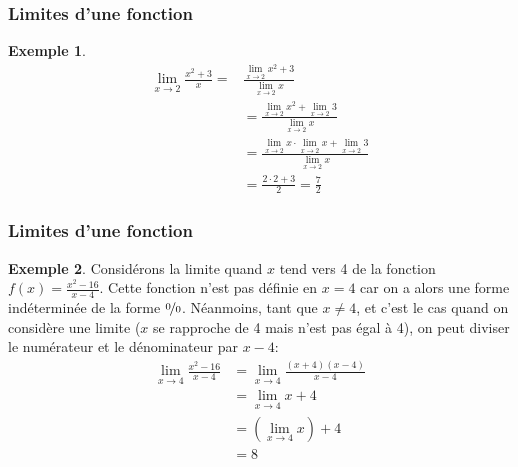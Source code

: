 \documentclass[10pt,notheorems]{beamer}
\theoremstyle{plain}
\theoremstyle{definition} %
\newtheorem{example}{Exemple}
\begin{document}
\begin{frame}
  \frametitle{Limites d'une fonction}

  \begin{example}

    \[
      \begin{split}
        \lim_{x\rightarrow 2}\frac{x^2+3}{x} =& \frac{\lim_{x\rightarrow 2} x^2 + 3}{\lim_{x\rightarrow 2} x}\\
        &= \frac{\lim_{x\rightarrow 2} x^2 + \lim_{x\rightarrow 2} 3}{\lim_{x\rightarrow 2} x}\\
        &= \frac{\lim_{x\rightarrow 2} x \cdot \lim_{x\rightarrow 2} x + \lim_{x\rightarrow 2} 3}{\lim_{x\rightarrow 2} x}\\
        &= \frac{2\cdot 2 + 3}{2} = \frac{7}{2}
      \end{split}
    \]

  \end{example}

\end{frame}


\begin{frame}
  \frametitle{Limites d'une fonction}

  \begin{example}
    Considérons la limite quand $x$ tend vers 4 de la fonction $f(x) = \frac{x^2-16}{x-4}$. Cette fonction n'est pas définie en $x=4$ car on a alors une forme indéterminée de la forme $\nicefrac{0}{0}$. Néanmoins, tant que $x\neq 4$, et c'est le cas quand on considère une limite ($x$ se rapproche de 4 mais n'est pas égal à 4), on peut diviser le numérateur et le dénominateur par $x-4$:
    \[
      \begin{split}
        \lim_{x\rightarrow 4}\frac{x^2-16}{x-4} &= \lim_{x\rightarrow 4} \frac{(x+4)(x-4)}{x-4}\\
        &= \lim_{x\rightarrow 4} x+4\\
        &= \left(\lim_{x\rightarrow 4} x\right)+4\\
        &= 8
      \end{split}
    \]

  \end{example}

\end{frame}
\end{document}
